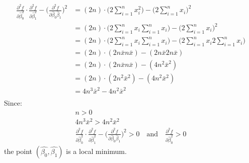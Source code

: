 \documentclass{article}
\begin{document}
\begin{align*}
    \frac{\partial^2f}{\partial \hat{\beta}_{0}^2} \cdot \frac{\partial^2f}{\partial \hat{\beta}_{1}^2} - \Bigg( \frac{\partial^2f}{\partial \hat{\beta}_{0} \hat{\beta}_{1}}\Bigg)^2 & = (2n)\cdot\Bigg(2\sum_{i=1}^{n}x_i^2\Bigg)-\Bigg(2\sum_{i=1}^{n}x_i\Bigg)^2 \\
    & = (2n)\cdot\Bigg(2\sum_{i=1}^{n}x_i\sum_{i=1}^{n}x_i\Bigg)-\Bigg(2\sum_{i=1}^{n}x_i\Bigg)^2 \\
    & = (2n)\cdot\Bigg(2\sum_{i=1}^{n}x_i\sum_{i=1}^{n}x_i\Bigg)-\Bigg(2\sum_{i=1}^{n}x_{i}2\sum_{i=1}^{n}x_i\Bigg) \\    
    & = (2n)\cdot(2n\bar{x}n\bar{x})-(2n\bar{x}2n\bar{x}) \\  
    & = (2n)\cdot(2n\bar{x}n\bar{x})-(4n^2\bar{x}^2) \\      
    & = (2n)\cdot(2n^2\bar{x}^2)-(4n^2\bar{x}^2) \\   
    & = 4n^3\bar{x}^2-4n^2\bar{x}^2 \\  
\end{align*}
Since:
\begin{gather*}
n > 0 \\
4n^3\bar{x}^2 > 4n^2\bar{x}^2 \\
\frac{\partial^2f}{\partial \hat{\beta}_{0}^2} \cdot \frac{\partial^2f}{\partial \hat{\beta}_{1}^2} - \Bigg( \frac{\partial^2f}{\partial \hat{\beta}_{0} \hat{\beta}_{1}}\Bigg)^2 > 0  \quad \textrm{and} \quad \frac{\partial^2f}{\partial \hat{\beta}_{0}^2} > 0
\end{gather*}
the point $(\hat{\beta_{0}}, \hat{\beta_{1}})$ is a local minimum.
\end{document}
